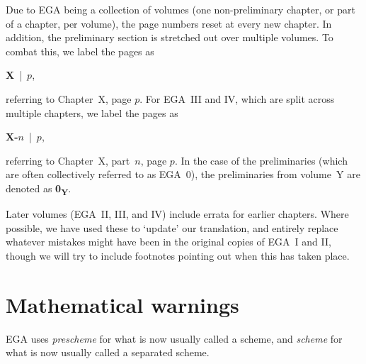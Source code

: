 Due to EGA being a collection of volumes (one non-preliminary chapter, or part of a chapter, per volume), the page numbers reset at every new chapter.
In addition, the preliminary section is stretched out over multiple volumes.
To combat this, we label the pages as
\begin{center}
  \textbf{X}~|~$p$,
\end{center}
referring to Chapter~X, page $p$.
For EGA~III and IV, which are split across multiple chapters, we label the pages as
\begin{center}
  \textbf{X-$n$}~|~$p$,
\end{center}
referring to Chapter~X, part~$n$, page $p$.
In the case of the preliminaries (which are often collectively referred to as EGA~0), the preliminaries from volume~Y are denoted as \textbf{0\textsubscript{Y}}.

\sectionbreak

Later volumes (EGA~II, III, and IV) include errata for earlier chapters.
Where possible, we have used these to `update' our translation, and entirely replace whatever mistakes might have been in the original copies of EGA~I and II, though we will try to include footnotes pointing out when this has taken place.

\section*{Mathematical warnings}
EGA uses \emph{prescheme} for what is now usually called a scheme, and \emph{scheme} for what is now usually called a separated scheme.



